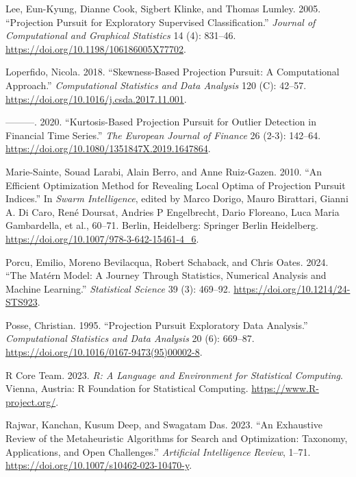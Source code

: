 \documentclass[
  12pt,
]{interact}
\newlength{\cslhangindent}
\newenvironment{CSLReferences}[2] %
 {\begin{list}{}{%
  \setlength{\itemindent}{0pt}
  \setlength{\leftmargin}{0pt}
  \setlength{\parsep}{0pt}
  \ifodd #1
   \setlength{\leftmargin}{\cslhangindent}
   \setlength{\itemindent}{-1\cslhangindent}
  \fi
  \setlength{\itemsep}{#2\baselineskip}}}
 {\end{list}}
\theoremstyle{plain}
\begin{document}
\begin{CSLReferences}{1}{0}
Lee, Eun-Kyung, Dianne Cook, Sigbert Klinke, and Thomas Lumley. 2005.
{``Projection Pursuit for Exploratory Supervised Classification.''}
\emph{Journal of Computational and Graphical Statistics} 14 (4):
831--46. \url{https://doi.org/10.1198/106186005X77702}.

Loperfido, Nicola. 2018. {``Skewness-Based Projection Pursuit: A
Computational Approach.''} \emph{Computational Statistics and Data
Analysis} 120 (C): 42--57.
\url{https://doi.org/10.1016/j.csda.2017.11.001}.

---------. 2020. {``Kurtosis-Based Projection Pursuit for Outlier
Detection in Financial Time Series.''} \emph{The European Journal of
Finance} 26 (2-3): 142--64.
\url{https://doi.org/10.1080/1351847X.2019.1647864}.

Marie-Sainte, Souad Larabi, Alain Berro, and Anne Ruiz-Gazen. 2010.
{``An Efficient Optimization Method for Revealing Local Optima of
Projection Pursuit Indices.''} In \emph{Swarm Intelligence}, edited by
Marco Dorigo, Mauro Birattari, Gianni A. Di Caro, René Doursat, Andries
P Engelbrecht, Dario Floreano, Luca Maria Gambardella, et al., 60--71.
Berlin, Heidelberg: Springer Berlin Heidelberg.
\url{https://doi.org/10.1007/978-3-642-15461-4_6}.

Porcu, Emilio, Moreno Bevilacqua, Robert Schaback, and Chris Oates.
2024. {``The {M}atérn Model: A Journey Through Statistics, Numerical
Analysis and Machine Learning.''} \emph{Statistical Science} 39 (3):
469--92. \url{https://doi.org/10.1214/24-STS923}.

Posse, Christian. 1995. {``Projection Pursuit Exploratory Data
Analysis.''} \emph{Computational Statistics and Data Analysis} 20 (6):
669--87. \url{https://doi.org/10.1016/0167-9473(95)00002-8}.

R Core Team. 2023. \emph{R: A Language and Environment for Statistical
Computing}. Vienna, Austria: R Foundation for Statistical Computing.
\url{https://www.R-project.org/}.

Rajwar, Kanchan, Kusum Deep, and Swagatam Das. 2023. {``An Exhaustive
Review of the Metaheuristic Algorithms for Search and Optimization:
Taxonomy, Applications, and Open Challenges.''} \emph{Artificial
Intelligence Review}, 1--71.
\url{https://doi.org/10.1007/s10462-023-10470-y}.


\end{CSLReferences}
\end{document}
